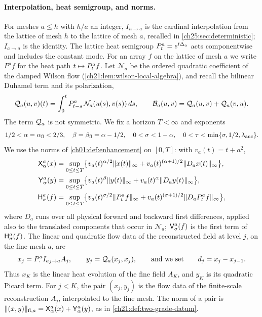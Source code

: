 \paragraph{Interpolation, heat semigroup, and norms.}
For meshes $a\le h$ with $h/a$ an integer, $I_{h\to a}$ is the cardinal interpolation from the lattice of mesh $h$ to the lattice of mesh $a$, recalled in \cref{ch25:sec:deterministic}; $I_{a\to a}$ is the identity. The lattice heat semigroup $P_{t}^{a}=e^{t\Delta_a}$ acts componentwise and includes the constant mode. For an array $f$ on the lattice of mesh $a$ we write $P^a_\cdot f$ for the heat path $t\mapsto P_{t}^{a}f$. Let $\mathcal N_a$ be the ordered quadratic coefficient of the damped Wilson flow (\cref{ch21:lem:wilson-local-algebra}), and recall the bilinear Duhamel term and its polarization,
\[
 \mathcal Q_{a}(u,v)(t)=\int_0^tP_{t-s}^{a}\,\mathcal N_a(u(s),v(s))\,ds,\qquad
 \mathcal B_{a}(u,v)=\mathcal Q_{a}(u,v)+\mathcal Q_{a}(v,u).
\]
The term $\mathcal Q_{a}$ is not symmetric. We fix a horizon $T<\infty$ and exponents
\[
 1/2<\alpha=\alpha_{\mathrm{fl}}<2/3,\quad \beta=\beta_{\mathrm{fl}}=\alpha-1/2,\quad 0<\sigma<1-\alpha,\quad 0<\tau<\min\{\sigma,1/2,\lambda_{\mathrm{anc}}\}.
\]
We use the norms of \cref{ch01:def:enhancement} on $[0,T]$: with $v_a(t)=t+a^2$,
\[
\begin{split}
 \mathsf X_{\alpha}^{a}(x)&=\sup_{0\le t\le T}\bigl\{v_a(t)^{\alpha/2}\lVert x(t)\rVert_\infty+v_a(t)^{(\alpha+1)/2}\lVert D_ax(t)\rVert_\infty\bigr\},\\
 \mathsf Y_{\alpha}^{a}(y)&=\sup_{0\le t\le T}\bigl\{v_a(t)^{\beta}\lVert y(t)\rVert_\infty+v_a(t)^{\alpha}\lVert D_ay(t)\rVert_\infty\bigr\},\\
 \mathsf H_{\sigma}^{a}(f)&=\sup_{0\le t\le T}\bigl\{v_a(t)^{\sigma/2}\lVert P_{t}^{a}f\rVert_\infty+v_a(t)^{(\sigma+1)/2}\lVert D_aP_{t}^{a}f\rVert_\infty\bigr\},
\end{split}
\]
where $D_a$ runs over all physical forward and backward first differences, applied also to the translated components that occur in $\mathcal N_a$; $\mathsf V_{\sigma}^{a}(f)$ is the first term of $\mathsf H_{\sigma}^{a}(f)$. The linear and quadratic flow data of the reconstructed field at level $j$, on the fine mesh $a$, are
\[
 x_j=P^a_\cdot I_{a_j\to a}A_j,\qquad y_j=\mathcal Q_{a}(x_j,x_j),\qquad\text{and we set}\qquad d_j=x_j-x_{j-1}.
\]
Thus $x_K$ is the linear heat evolution of the fine field $A_K$, and $y_K$ is its quadratic Picard term. For $j<K$, the pair $(x_j,y_j)$ is the flow data of the finite-scale reconstruction $A_j$, interpolated to the fine mesh. The norm of a pair is $\lVert (x,y)\rVert_{\mathrm{fl},a}=\mathsf X_{\alpha}^{a}(x)+\mathsf Y_{\alpha}^{a}(y)$, as in \cref{ch21:def:two-grade-datum}.

